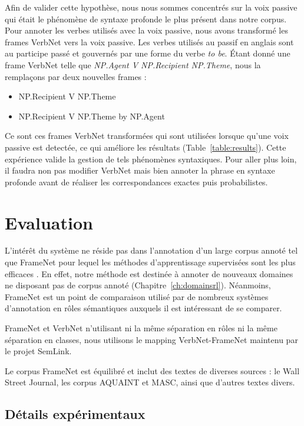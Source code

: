 Afin de valider cette hypothèse, nous nous sommes concentrés sur la voix
passive qui était le phénomène de syntaxe profonde le plus présent dans notre
corpus.  Pour annoter les verbes utilisés avec la voix passive, nous avons
transformé les frames VerbNet vers la voix passive. Les verbes utilisés au
passif en anglais sont au participe passé et gouvernés par une forme du verbe
\emph{to be}. Étant donné une frame VerbNet telle que \emph{NP.Agent V
NP.Recipient NP.Theme}, nous la remplaçons par deux nouvelles frames :

\begin{itemize}
    \item NP.Recipient V NP.Theme
    \item NP.Recipient V NP.Theme by NP.Agent
\end{itemize}

Ce sont ces frames VerbNet transformées qui sont utilisées lorsque qu'une voix
passive est detectée, ce qui améliore les résultats
(Table~\ref{table:results}). Cette expérience valide la gestion de tels
phénomènes syntaxiques. Pour aller plus loin, il faudra non pas modifier
VerbNet mais bien annoter la phrase en syntaxe profonde avant de réaliser les
correspondances exactes puis probabilistes.

\section{Evaluation}
\label{srl:evaluation}

L'intérêt du système ne réside pas dans l'annotation d'un large corpus annoté
tel que FrameNet pour lequel les méthodes d'apprentissage supervisées sont les
plus efficaces \citep{das2014frame}. En effet, notre méthode est destinée à
annoter de nouveaux domaines ne disposant pas de corpus annoté
(Chapitre~\ref{ch:domainsrl}). Néanmoins, FrameNet est un point de comparaison
utilisé par de nombreux systèmes d'annotation en rôles sémantiques auxquels il
est intéressant de se comparer.

FrameNet et VerbNet n'utilisant ni la même séparation en rôles ni la même
séparation en classes, nous utilisons le mapping VerbNet-FrameNet maintenu par
le projet SemLink.

Le corpus FrameNet est équilibré et inclut des textes de diverses sources : le
Wall Street Journal, les corpus AQUAINT et MASC, ainsi que d'autres textes
divers.

\subsection{Détails expérimentaux}
\label{subsec:details_exp}

